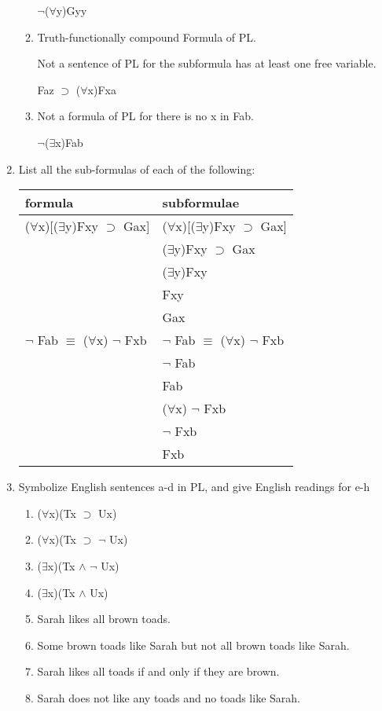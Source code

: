 \documentclass[12pt,letterpaper]{article}
\begin{document}
\begin{enumerate}
\begin{enumerate}
          \underline{$\neg$}($\forall$y)Gyy
        \item
          Truth-functionally compound Formula of PL.

          Not a sentence of PL for the subformula has at least one free variable.

          Faz \underline{$\supset$} ($\forall$x)Fxa
        \item
          Not a formula of PL for there is no x in Fab.

          $\neg$($\exists$x)Fab
      \end{enumerate}

    \item
      List all the sub-formulas of each of the following:

      \begin{tabular}{l l}
        formula & subformulae \\
        \hline
        ($\forall$x)[($\exists$y)Fxy $\supset$ Gax] & ($\forall$x)[($\exists$y)Fxy $\supset$ Gax] \\
        & ($\exists$y)Fxy $\supset$ Gax \\
        & ($\exists$y)Fxy \\
        & Fxy \\
        & Gax \\

        $\neg$ Fab $\equiv$ ($\forall$x) $\neg$ Fxb & $\neg$ Fab $\equiv$ ($\forall$x) $\neg$ Fxb \\
        & $\neg$ Fab \\
        & Fab \\
        & ($\forall$x) $\neg$ Fxb \\
        & $\neg$ Fxb \\
        & Fxb \\
      \end{tabular}

    \item
      Symbolize English sentences a-d in PL,
      and give English readings for e-h

      \begin{enumerate}
        \item ($\forall$x)(Tx $\supset$ Ux)
        \item ($\forall$x)(Tx $\supset$ $\neg$ Ux)
        \item ($\exists$x)(Tx $\land$ $\neg$ Ux)
        \item ($\exists$x)(Tx $\land$ Ux)
        \item Sarah likes all brown toads.
        \item Some brown toads like Sarah but not all brown toads like Sarah.
        \item Sarah likes all toads if and only if they are brown.
        \item Sarah does not like any toads and no toads like Sarah.
      \end{enumerate}


\end{enumerate}
\end{document}

